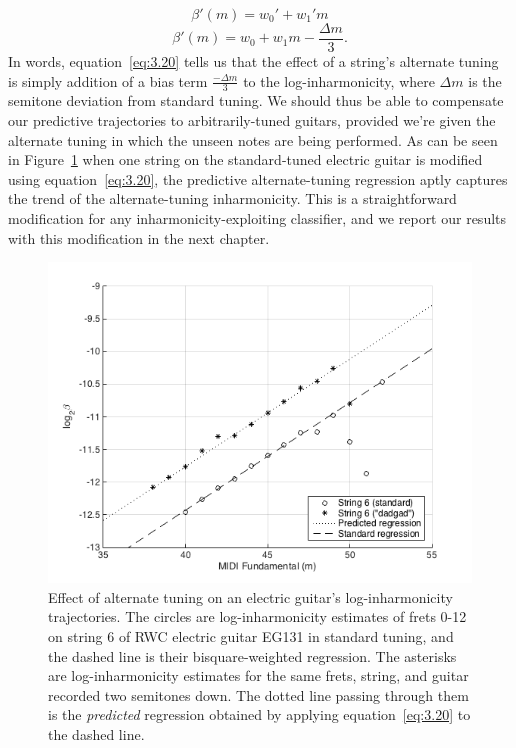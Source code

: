 \documentclass[12pt]{cmuthesis}
\begin{document}
\begin{equation}
\label{eq:3.19}
\beta'(m) = w_0' + w_1'm
\end{equation}
\begin{equation}
\label{eq:3.20}
\beta'(m) = w_0 + w_1m - \frac{\Delta m}{3}.
\end{equation}
In words, equation~\eqref{eq:3.20} tells us that the effect of a string's alternate tuning is simply addition of a bias term $\frac{-\Delta m}{3}$ to the log-inharmonicity, where $\Delta m$ is the semitone deviation from standard tuning. We should thus be able to compensate our predictive trajectories to arbitrarily-tuned guitars, provided we're given the alternate tuning in which the unseen notes are being performed. As can be seen in Figure~\ref{fig:tuning-eg} when one string on the standard-tuned electric guitar is modified using equation~\eqref{eq:3.20}, the predictive alternate-tuning regression aptly captures the trend of the alternate-tuning inharmonicity. This is a straightforward modification for any inharmonicity-exploiting classifier, and we report our results with this modification in the next chapter.
\begin{figure}[!htbp] 
\label{fig:tuning-eg}
\centering
\includegraphics[scale=0.75]{tuning-eg}
\caption{Effect of alternate tuning on an electric guitar's log-inharmonicity trajectories. The circles are log-inharmonicity estimates of frets 0-12 on string 6 of RWC electric guitar EG131 in standard tuning, and the dashed line is their bisquare-weighted regression. The asterisks are log-inharmonicity estimates for the same frets, string, and guitar recorded two semitones down. The dotted line passing through them is the \textit{predicted} regression obtained by applying equation~\eqref{eq:3.20} to the dashed line.}
\end{figure}
\end{document}
